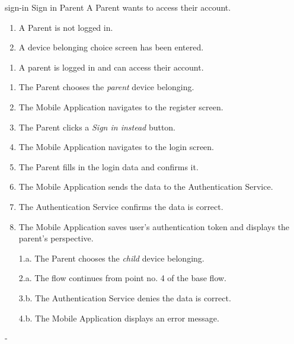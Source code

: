 {sign-in}
{Sign in}
{Parent}
{A Parent wants to access their account.}
{\begin{enumerate} %
    \item A Parent is not logged in.
    \item A device belonging choice screen has been entered.
\end{enumerate}}
{\begin{enumerate} %
   \item A parent is logged in and can access their account.
\end{enumerate}}
{\begin{enumerate} %
   \item The Parent chooses the \textit{parent} device belonging.
   \item The Mobile Application navigates to the register screen.
   \item The Parent clicks a \textit{Sign in instead} button.
   \item The Mobile Application navigates to the login screen.
   \item The Parent fills in the login data and confirms it.
   \item The Mobile Application sends the data to the Authentication Service.
   \item The Authentication Service confirms the data is correct.
   \item The Mobile Application saves user's authentication token and displays the parent's perspective.
\end{enumerate}}
{\begin{enumerate} %
    \item[1.a.] The Parent chooses the \textit{child} device belonging.
    \item[2.a.] The flow continues from point no. 4 of the base flow.
\end{enumerate}}
{\begin{enumerate} %
    \item[3.b.] The Authentication Service denies the data is correct.
    \item[4.b.] The Mobile Application displays an error message.
\end{enumerate}}
{-} %

